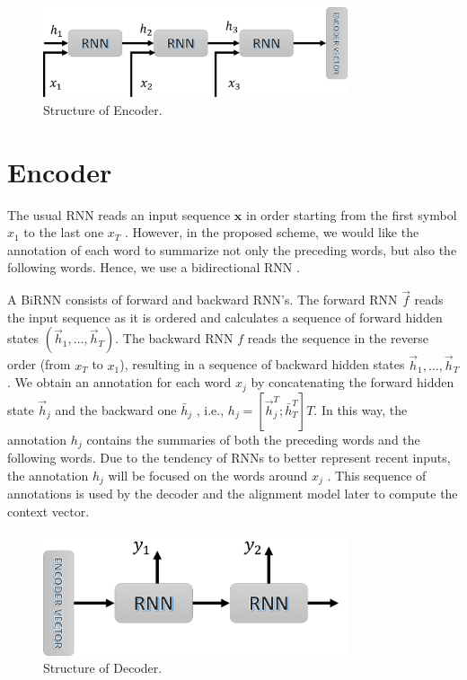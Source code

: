 \begin{figure}[ht]
    \centering
    \includegraphics[width=0.8\textwidth]{ECODER.png}
    \caption{Structure of Encoder.}
    \label{fig:6}
\end{figure}

\section{Encoder}
The usual RNN reads an input sequence $\mathbf{x}$ in order starting from the first symbol $x_1$ to the last one $x_T$ . However, in the proposed scheme, we would like the annotation of each word to summarize not only the preceding words, but also the following words. Hence, we use a bidirectional RNN \cite{schuster1997bidirectional}.

A BiRNN consists of forward and backward RNN’s. The forward RNN $\vec{f}$ reads the input sequence  as it is ordered and calculates a sequence of forward hidden states $\left({\vec{h}}_1,\ldots,{\vec{h}}_T\right)$. 
The backward RNN $f$ reads the sequence in the reverse order (from $x_T$ to $x_1$), resulting in a sequence of backward hidden states $\vec{h}_1,\ldots,{\vec{h}}_T$. 
We obtain an annotation for each word $x_j$ by concatenating the forward hidden state ${\vec{h}}_j$ and the backward one ${\bar{h}}_j$ , i.e., $h_j=[\vec{h}_j^T;\bar{h}_T^T]T$. 
In this way, the annotation $h_j$ contains the summaries of both the preceding words and the following words. Due to the tendency of RNNs to better represent recent inputs, the annotation $h_j$ will be focused on the words around $x_j$ . This sequence of annotations is used by the decoder and the alignment model later to compute the context vector.

\begin{figure}[ht]
    \centering
    \includegraphics[width=0.8\textwidth]{Decoder.png}
    \caption{Structure of Decoder.}
    \label{fig:7}
\end{figure}